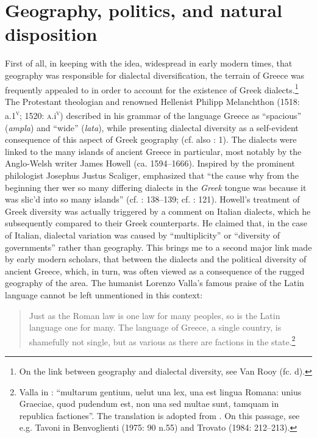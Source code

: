 \section{Geography, politics, and natural disposition}

First of all, in keeping with the idea, widespread in early modern times, that geography was responsible for dialectal diversification, the terrain of Greece was frequently appealed to in order to account for the existence of Greek dialects.\footnote{On the link between geography and dialectal diversity, see Van Rooy (fc. d).} The Protestant theologian and renowned Hellenist Philipp Melanchthon (1518: a.1\textsc{\textsuperscript{v}}; 1520: \textsc{a.}i\textsc{\textsuperscript{v}}) described in his grammar of the language Greece as “spacious” (\textit{ampla}) and “wide” (\textit{lata}), while presenting dialectal diversity as a self-evident consequence of this aspect of Greek geography (cf. also \citealt{Ruland1556}: 1). The dialects were linked to the many islands of ancient Greece in particular, most notably by the Anglo-Welsh writer James Howell (ca. 1594–1666). Inspired by the prominent philologist Josephus Justus Scaliger, \citet[89]{Howell1650b} emphasized that “the cause why from the beginning ther wer so many differing dialects in the \textit{Greek} tongue was because it was slic’d into so many islands” (cf. \citealt{Howell1642}: 138–139; cf. \citealt{Scaliger1610}: 121). Howell’s treatment of Greek diversity was actually triggered by a comment on Italian dialects, which he subsequently compared to their Greek counterparts. He claimed that, in the case of Italian, dialectal variation was caused by “multiplicity” or “diversity of governments” rather than geography. This brings me to a second major link made by early modern scholars, that between the dialects and the political diversity of ancient Greece, which, in turn, was often viewed as a consequence of the rugged geography of the area. The humanist Lorenzo Valla’s famous praise of the Latin language cannot be left unmentioned in this context:

\begin{quote}
Just as the Roman law is one law for many peoples, so is the Latin language one for many. The language of Greece, a single country, is shamefully not single, but as various as there are factions in the state.\footnote{Valla in \citet[122]{Regoliosi1993}: “multarum gentium, uelut una lex, una est lingua Romana: unius Graeciae, quod pudendum est, non una sed multae sunt, tamquam in republica factiones”. The translation is adopted from \citet[10]{Trapp1990}. On this passage, see e.g. Tavoni in Benvoglienti (1975: 90 n.55) and Trovato (1984: 212–213).}
\end{quote}

